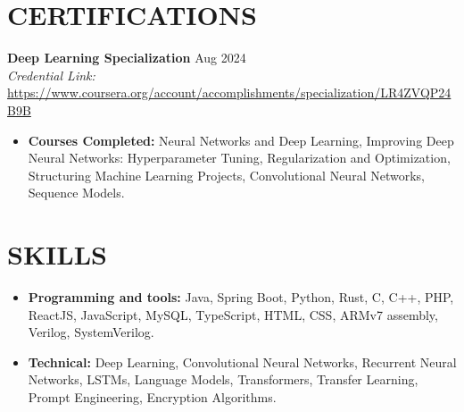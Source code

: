 \documentclass[a4paper,1.5pt]{extarticle}
\begin{document}
\section*{CERTIFICATIONS}
\noindent
\textbf{Deep Learning Specialization} \hfill Aug 2024 \\
\textit{Credential Link:} \url{https://www.coursera.org/account/accomplishments/specialization/LR4ZVQP24B9B}
\begin{itemize}
    \item \textbf{Courses Completed:} Neural Networks and Deep Learning, Improving Deep Neural Networks: Hyperparameter Tuning, Regularization and Optimization, Structuring Machine Learning Projects, Convolutional Neural Networks, Sequence Models.
    
\end{itemize}
\section*{SKILLS}
\begin{itemize}
    \item \textbf{Programming and tools:} Java, Spring Boot, Python, Rust, C, C++, PHP, ReactJS, JavaScript, MySQL, TypeScript, HTML, CSS, ARMv7 assembly, Verilog, SystemVerilog.
    \item \textbf{Technical:} Deep Learning, Convolutional Neural Networks, Recurrent Neural Networks, LSTMs, Language Models, Transformers, Transfer Learning, Prompt Engineering, Encryption Algorithms. 
\end{itemize}

\end{document}
